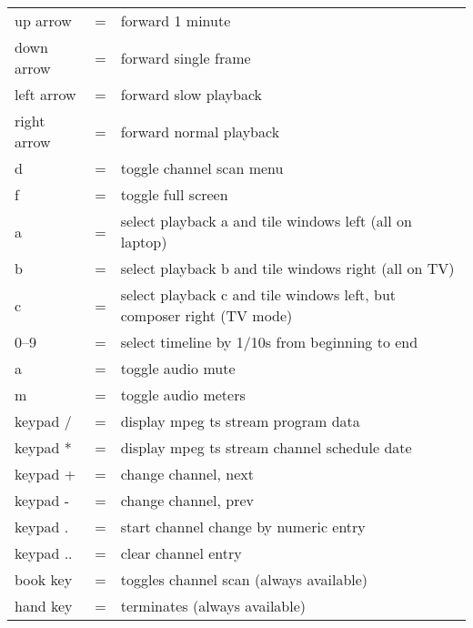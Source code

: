 \begin{tabular}{lc p{12cm}}
	\toprule
    up arrow&=&forward 1 minute\\
    
    down arrow&=&forward single frame\\
    
    left arrow&=&forward slow playback\\
    
    right arrow&=&forward normal playback\\
    
    d&=&toggle channel scan menu\\
    
    f&=&toggle full screen\\
    
    a&=&select playback a and tile windows left (all on laptop)\\
    
    b&=&select playback b and tile windows right (all on TV)\\
    
    c&=&select playback c and tile windows left, but composer right (TV mode)\\
    
    0--9&=&select timeline by 1/10s from beginning to end\\
    
    a&=&toggle audio mute\\
    
    m&=&toggle audio meters\\
    
    keypad /&=&display mpeg ts stream program data\\
    
    keypad *&=&display mpeg ts stream channel schedule date\\
    
    keypad +&=&change channel, next\\
    
    keypad -&=&change channel, prev\\
    
    keypad .&=&start channel change by numeric entry\\
    
    keypad ..&=&clear channel entry\\
    
    book key&=&toggles channel scan (always available)\\
    
    hand key&=&terminates \CGG{} (always available)\\ 
    \bottomrule 
\end{tabular}

